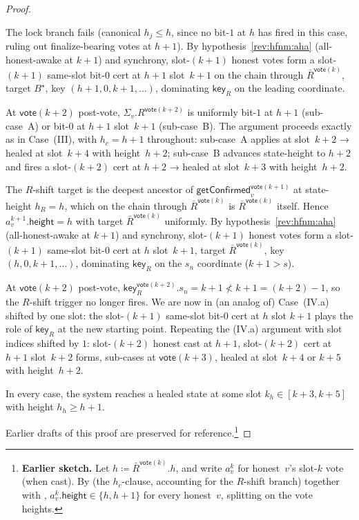 \ifx\litemode\undefined\documentclass{article}\fi
\newcommand{\height}{\mathsf{height}}
\newcommand{\key}{\mathsf{key}}
\newcommand{\vote}{\mathsf{vote}}
\newcommand{\comm}[1]{\bar{#1}}
\newcommand{\getConfirmed}{\textsf{getConfirmed}\xspace}
\theoremstyle{plain}
\theoremstyle{definition}
\theoremstyle{remark}
\newcommand{\AHA}{all-honest-awake\xspace}
\begin{document}
\begin{proof}
\begin{description}
\begin{description}
The lock branch fails (canonical $h_j \leq h$, since no bit-$1$ at $h$ has fired in this case, ruling out finalize-bearing votes at $h+1$). By hypothesis~\ref{rev:hfnm:aha} (\AHA at $k+1$) and synchrony, slot-$(k+1)$ honest votes form a slot-$(k+1)$ same-slot bit-$0$ cert at $h+1$ slot~$k+1$ on the chain through $\comm{R}^{\vote(k)}$, target $B^{\star}$, key $(h+1, 0, k+1, \ldots)$, dominating $\key_R$ on the leading coordinate.

At $\vote(k+2)$ post-vote, $\Sigma_v.R^{\vote(k+2)}$ is uniformly bit-$1$ at $h+1$ (sub-case~A) or bit-$0$ at $h+1$ slot~$k+1$ (sub-case~B). The argument proceeds exactly as in Case~(III), with $h_c = h+1$ throughout: sub-case~A applies  at slot~$k+2$ → healed at slot~$k+4$ with height~$h+2$; sub-case~B advances state-height to $h+2$ and fires a slot-$(k+2)$ cert at $h+2$ → healed at slot~$k+3$ with height~$h+2$.

\item[{(IV.b): $s < k$ — $R$-shift fires.}]\hfill

The $R$-shift target is the deepest ancestor of $\getConfirmed_v^{\vote(k+1)}$ at state-height $h_R = h$, which on the chain through $\comm{R}^{\vote(k)}$ is $\comm{R}^{\vote(k)}$ itself. Hence $a^{k+1}_v.\height = h$ with target $\comm{R}^{\vote(k)}$ uniformly. By hypothesis~\ref{rev:hfnm:aha} (\AHA at $k+1$) and synchrony, slot-$(k+1)$ honest votes form a slot-$(k+1)$ same-slot bit-$0$ cert at $h$ slot~$k+1$, target $\comm{R}^{\vote(k)}$, key $(h, 0, k+1, \ldots)$, dominating $\key_R$ on the $s_n$ coordinate ($k+1 > s$).

At $\vote(k+2)$ post-vote, $\key_R^{\vote(k+2)}.s_n = k+1 \not< k+1 = (k+2) - 1$, so the $R$-shift trigger no longer fires. We are now in (an analog of) Case~(IV.a) shifted by one slot: the slot-$(k+1)$ same-slot bit-$0$ cert at $h$ slot $k+1$ plays the role of $\key_R$ at the new starting point. Repeating the (IV.a) argument with slot indices shifted by $1$: slot-$(k+2)$ honest cast at $h+1$, slot-$(k+2)$ cert at $h+1$ slot~$k+2$ forms, sub-cases at $\vote(k+3)$, healed at slot~$k+4$ or $k+5$ with height~$h+2$.
\end{description}
\end{description}

In every case, the system reaches a healed state at some slot $k_h \in [k+3, k+5]$ with height $h_h \geq h+1$.

\noindent Earlier drafts of this proof are preserved for reference.\footnote{\textbf{Earlier sketch.} Let $h \coloneqq \comm{R}^{\vote(k)}.h$, and write $a^k_v$ for honest~$v$'s slot-$k$ vote (when cast). By  (the $h_c$-clause, accounting for the $R$-shift branch) together with , $a^k_v.\height \in \{h, h+1\}$ for every honest~$v$, splitting on the vote heights.

}
\end{proof}
\end{document}
